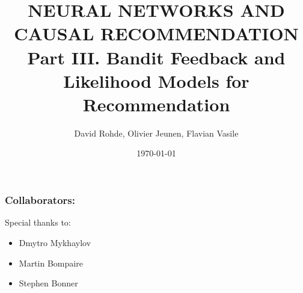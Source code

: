 \documentclass[10pt]{beamer}
\title{NEURAL NETWORKS AND CAUSAL RECOMMENDATION 
Part III. Bandit Feedback and Likelihood Models for Recommendation}
\date{\today}
\author{David Rohde, Olivier Jeunen, Flavian Vasile}
\institute{Criteo Research}
\begin{document}
\maketitle

\begin{frame}
\frametitle{Collaborators:}

Special thanks to:
\begin{itemize}
    \item Dmytro Mykhaylov
    \item Martin Bompaire
    \item Stephen Bonner
\end{itemize}

\end{frame}









%
%
%
%
%
%
%
%
%
%


\end{document}
